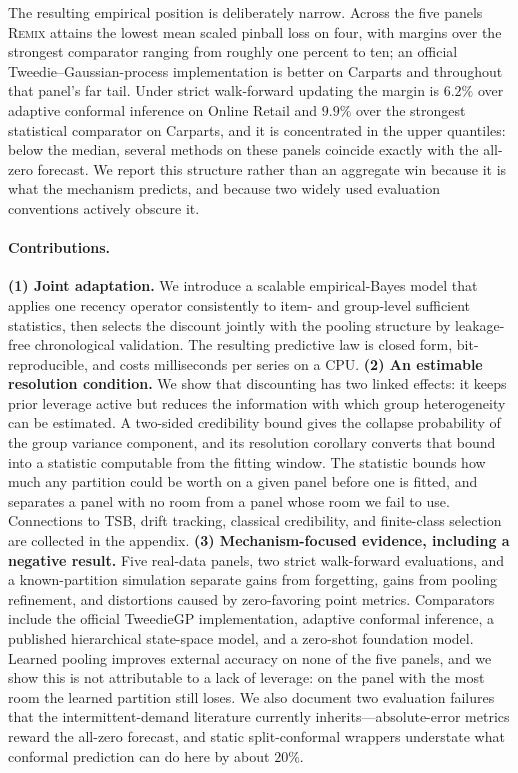 \documentclass[twocolumn,10pt]{article}
\theoremstyle{definition}
\newcommand{\REMIX}{\textsc{Remix}}
\begin{document}
The resulting empirical position is deliberately narrow. Across the five
panels \REMIX{} attains the lowest mean scaled pinball loss on four, with
margins over the strongest comparator ranging from roughly one percent to
ten; an official Tweedie--Gaussian-process implementation is
better on Carparts and throughout that panel's far tail. Under strict
walk-forward updating the margin is $6.2\%$ over adaptive conformal
inference on Online Retail and $9.9\%$ over the strongest statistical
comparator on Carparts, and it is concentrated in the upper quantiles:
below the median, several methods on these panels coincide exactly with
the all-zero forecast. We report this structure rather than an aggregate
win because it is what the mechanism predicts, and because two widely used
evaluation conventions actively obscure it.

\paragraph{Contributions.}
\textbf{(1) Joint adaptation.} We introduce a scalable empirical-Bayes
model that applies one recency operator consistently to item- and
group-level sufficient statistics, then selects the discount jointly with
the pooling structure by leakage-free chronological validation. The
resulting predictive law is closed form, bit-reproducible, and costs
milliseconds per series on a CPU.
\textbf{(2) An estimable resolution condition.} We show that discounting
has two linked effects: it keeps prior leverage active but reduces the
information with which group heterogeneity can be estimated. A two-sided
credibility bound gives the collapse probability of the group variance
component, and its resolution corollary converts that bound into a
statistic computable from the fitting window. The statistic bounds how
much any partition could be worth on a given panel before one is fitted,
and separates a panel with no room from a panel whose room we fail to use.
Connections to TSB, drift tracking, classical credibility, and
finite-class selection are collected in the appendix.
\textbf{(3) Mechanism-focused evidence, including a negative result.}
Five real-data panels, two strict walk-forward evaluations, and a
known-partition simulation separate gains from forgetting, gains from
pooling refinement, and distortions caused by zero-favoring point metrics.
Comparators include the official TweedieGP implementation, adaptive
conformal inference, a published hierarchical state-space model, and a
zero-shot foundation model. Learned pooling improves external accuracy on
none of the five panels, and we show this is not attributable to a lack of
leverage: on the panel with the most room the learned partition still
loses. We also document two evaluation failures that the
intermittent-demand literature currently inherits---absolute-error metrics
reward the all-zero forecast, and static split-conformal wrappers
understate what conformal prediction can do here by about $20\%$.
\end{document}
